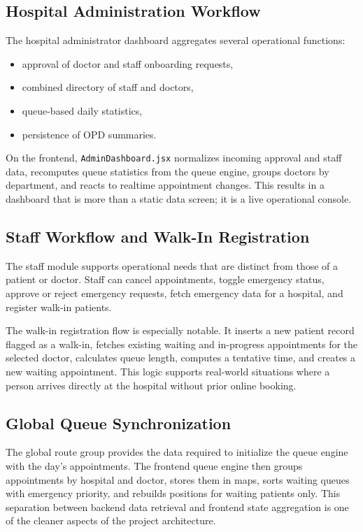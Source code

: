 \documentclass[12pt,onecolumn]{IEEEtran}
\begin{document}
\subsection{Hospital Administration Workflow}
The hospital administrator dashboard aggregates several operational functions:
\begin{itemize}
    \item approval of doctor and staff onboarding requests,
    \item combined directory of staff and doctors,
    \item queue-based daily statistics,
    \item persistence of OPD summaries.
\end{itemize}

On the frontend, \texttt{AdminDashboard.jsx} normalizes incoming approval and staff data, recomputes queue statistics from the queue engine, groups doctors by department, and reacts to realtime appointment changes. This results in a dashboard that is more than a static data screen; it is a live operational console.

\subsection{Staff Workflow and Walk-In Registration}
The staff module supports operational needs that are distinct from those of a patient or doctor. Staff can cancel appointments, toggle emergency status, approve or reject emergency requests, fetch emergency data for a hospital, and register walk-in patients.

The walk-in registration flow is especially notable. It inserts a new patient record flagged as a walk-in, fetches existing waiting and in-progress appointments for the selected doctor, calculates queue length, computes a tentative time, and creates a new waiting appointment. This logic supports real-world situations where a person arrives directly at the hospital without prior online booking.

\subsection{Global Queue Synchronization}
The global route group provides the data required to initialize the queue engine with the day's appointments. The frontend queue engine then groups appointments by hospital and doctor, stores them in maps, sorts waiting queues with emergency priority, and rebuilds positions for waiting patients only. This separation between backend data retrieval and frontend state aggregation is one of the cleaner aspects of the project architecture.
\end{document}
